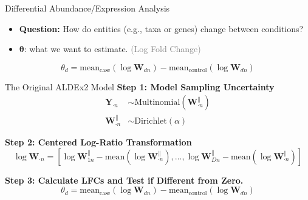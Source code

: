 \documentclass[
  ignorenonframetext,
]{beamer}
\begin{document}
\begin{frame}{Differential Abundance/Expression Analysis}
\protect\hypertarget{differential-abundanceexpression-analysis-1}{}
\begin{itemize}
\item
  \textbf{Question:} How do entities (e.g., taxa or genes) change
  between conditions?
\item
  \(\boldsymbol{\theta}\): what we want to estimate.
  \textcolor{gray}{(Log Fold Change)}
\end{itemize}

\vspace{.25in}

\begin{equation*}
\theta_d = \text{mean}_{\text{case}}(\log \mathbf{W}_{dn}) - \text{mean}_{\text{control}}(\log \mathbf{W}_{dn})
\end{equation*}
\end{frame}

\begin{frame}{The Original ALDEx2 Model}
\protect\hypertarget{the-original-aldex2-model}{}
\textbf{Step 1: Model Sampling Uncertainty} \begin{align*}
\mathbf{Y}_{\cdot n} &\sim \text{Multinomial}(\mathbf{W}_{\cdot n}^\parallel)\\
\mathbf{W}_{\cdot n}^\parallel &\sim \text{Dirichlet}(\alpha)
\end{align*}

\textbf{Step 2: Centered Log-Ratio Transformation} \begin{equation*}
\log \mathbf{W}_{\cdot n} = \left[\log \mathbf{W}_{1n}^\parallel - \text{mean}(\log \mathbf{W}_{\cdot n}^\parallel), ..., \log \mathbf{W}_{Dn}^\parallel - \text{mean}(\log \mathbf{W}_{\cdot n}^\parallel) \right]
\end{equation*}

\textbf{Step 3: Calculate LFCs and Test if Different from Zero.}
\begin{equation*}
\theta_d = \text{mean}_{\text{case}}(\log \mathbf{W}_{dn}) - \text{mean}_{\text{control}}(\log \mathbf{W}_{dn})
\end{equation*}
\end{frame}
\end{document}

